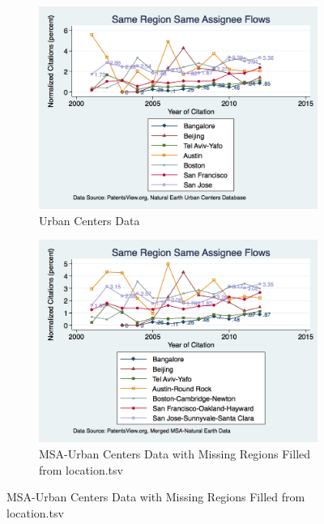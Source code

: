 \documentclass[12pt]{article}
\begin{document}
\begin{figure}
  \begin{subfigure}[b]{\textwidth}
    \includegraphics[width=\textwidth]{UCSameRegionSameAssigneeFlows}
    \caption{Urban Centers Data}
    \label{fig:UCSameRegionSameAssigneeFlows}
  \end{subfigure}
  
  \begin{subfigure}[b]{\textwidth}
    \includegraphics[width=\textwidth]{SameRegionSameAssigneeFlows}
    \caption{MSA-Urban Centers Data with Missing Regions Filled from location.tsv}
    \label{fig:SameRegionSameAssigneeFlows}
  \end{subfigure}
\end{figure}
\end{document}
